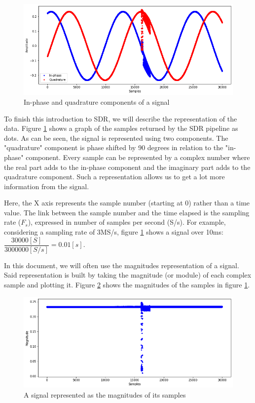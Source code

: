 \begin{figure}[htp!]
  \centering
  \includegraphics[scale=0.5]{figures/concepts_IQ-signal.png}
  \caption{In-phase and quadrature components of a signal}
  \label{fig:iq-signal}
\end{figure}

To finish this introduction to SDR, we will describe the representation of the data. Figure \ref{fig:iq-signal} shows a graph of the samples returned by the SDR pipeline as dots. As can be seen, the signal is represented using two components. The "quadrature" component is phase shifted by 90 degrees in relation to the "in-phase" component. Every sample can be represented by a complex number where the real part adds to the in-phase component and the imaginary part adds to the quadrature component. Such a representation allows us to get a lot more information from the signal. \cite{kuisma_iq, ossmann_software}

Here, the X axis represents the sample number (starting at 0) rather than a time value. The link between the sample number and the time elapsed is the sampling rate ($F_s$), expressed in number of samples per second (S/s). For example, considering a sampling rate of 3MS/s, figure \ref{fig:iq-signal} shows a signal over 10ms: $\dfrac{30000[S]}{3000000[S/s]} = 0.01[s]$.

In this document, we will often use the magnitudes representation of a signal. Said representation is built by taking the magnitude (or module) of each complex sample and plotting it. Figure \ref{fig:mag} shows the magnitudes of the samples in figure \ref{fig:iq-signal}.

\begin{figure}[htp!]
  \centering
  \includegraphics[scale=0.5]{figures/concepts_magnitudes.png}
  \caption{A signal represented as the magnitudes of its samples}
  \label{fig:mag}
\end{figure}

